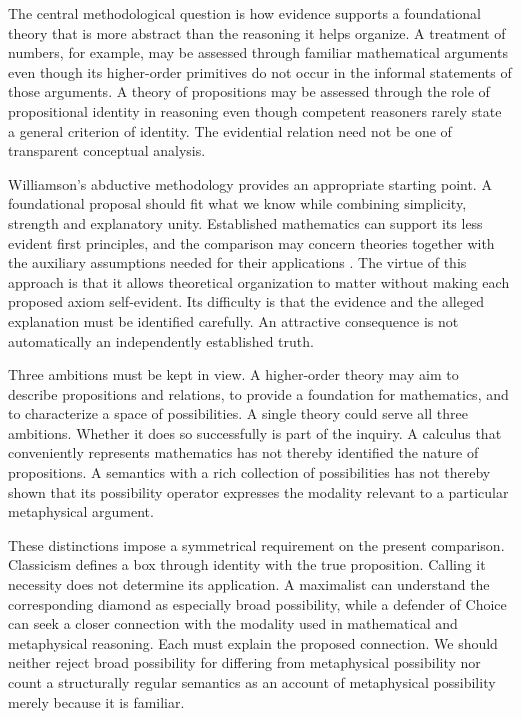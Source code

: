 \documentclass[11pt]{article}
\begin{document}
The central methodological question is how evidence supports a foundational theory that is more abstract than the reasoning it helps organize. A treatment of numbers, for example, may be assessed through familiar mathematical arguments even though its higher-order primitives do not occur in the informal statements of those arguments. A theory of propositions may be assessed through the role of propositional identity in reasoning even though competent reasoners rarely state a general criterion of identity. The evidential relation need not be one of transparent conceptual analysis.

Williamson's abductive methodology provides an appropriate starting point. A foundational proposal should fit what we know while combining simplicity, strength and explanatory unity. Established mathematics can support its less evident first principles, and the comparison may concern theories together with the auxiliary assumptions needed for their applications \citep[p.~266 and pp.~270--273]{williamson2016}. The virtue of this approach is that it allows theoretical organization to matter without making each proposed axiom self-evident. Its difficulty is that the evidence and the alleged explanation must be identified carefully. An attractive consequence is not automatically an independently established truth.

Three ambitions must be kept in view. A higher-order theory may aim to describe propositions and relations, to provide a foundation for mathematics, and to characterize a space of possibilities. A single theory could serve all three ambitions. Whether it does so successfully is part of the inquiry. A calculus that conveniently represents mathematics has not thereby identified the nature of propositions. A semantics with a rich collection of possibilities has not thereby shown that its possibility operator expresses the modality relevant to a particular metaphysical argument.

These distinctions impose a symmetrical requirement on the present comparison. Classicism defines a box through identity with the true proposition. Calling it necessity does not determine its application. A maximalist can understand the corresponding diamond as especially broad possibility, while a defender of Choice can seek a closer connection with the modality used in mathematical and metaphysical reasoning. Each must explain the proposed connection. We should neither reject broad possibility for differing from metaphysical possibility nor count a structurally regular semantics as an account of metaphysical possibility merely because it is familiar.
\end{document}

